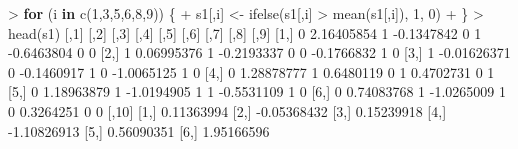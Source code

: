 \documentclass[
]{article}
\newenvironment{Shaded}{\begin{snugshade}}{\end{snugshade}}
\newcommand{\ControlFlowTok}[1]{\textcolor[rgb]{0.13,0.29,0.53}{\textbf{#1}}}
\newcommand{\DecValTok}[1]{\textcolor[rgb]{0.00,0.00,0.81}{#1}}
\newcommand{\FloatTok}[1]{\textcolor[rgb]{0.00,0.00,0.81}{#1}}
\newcommand{\FunctionTok}[1]{\textcolor[rgb]{0.00,0.00,0.00}{#1}}
\newcommand{\NormalTok}[1]{#1}
\newcommand{\OtherTok}[1]{\textcolor[rgb]{0.56,0.35,0.01}{#1}}
\newcommand{\SpecialCharTok}[1]{\textcolor[rgb]{0.00,0.00,0.00}{#1}}
\begin{document}
\begin{Shaded}
\begin{Highlighting}[]
\SpecialCharTok{\textgreater{}} \ControlFlowTok{for}\NormalTok{ (i }\ControlFlowTok{in} \FunctionTok{c}\NormalTok{(}\DecValTok{1}\NormalTok{,}\DecValTok{3}\NormalTok{,}\DecValTok{5}\NormalTok{,}\DecValTok{6}\NormalTok{,}\DecValTok{8}\NormalTok{,}\DecValTok{9}\NormalTok{)) \{}
\SpecialCharTok{+}\NormalTok{   s1[,i] }\OtherTok{\textless{}{-}} \FunctionTok{ifelse}\NormalTok{(s1[,i] }\SpecialCharTok{\textgreater{}} \FunctionTok{mean}\NormalTok{(s1[,i]), }\DecValTok{1}\NormalTok{, }\DecValTok{0}\NormalTok{)}
\SpecialCharTok{+}\NormalTok{ \}}
\SpecialCharTok{\textgreater{}} \FunctionTok{head}\NormalTok{(s1)}
\NormalTok{     [,}\DecValTok{1}\NormalTok{]        [,}\DecValTok{2}\NormalTok{] [,}\DecValTok{3}\NormalTok{]       [,}\DecValTok{4}\NormalTok{] [,}\DecValTok{5}\NormalTok{] [,}\DecValTok{6}\NormalTok{]       [,}\DecValTok{7}\NormalTok{] [,}\DecValTok{8}\NormalTok{] [,}\DecValTok{9}\NormalTok{]}
\NormalTok{[}\DecValTok{1}\NormalTok{,]    }\DecValTok{0}  \FloatTok{2.16405854}    \DecValTok{1} \SpecialCharTok{{-}}\FloatTok{0.1347842}    \DecValTok{0}    \DecValTok{1} \SpecialCharTok{{-}}\FloatTok{0.6463804}    \DecValTok{0}    \DecValTok{0}
\NormalTok{[}\DecValTok{2}\NormalTok{,]    }\DecValTok{1}  \FloatTok{0.06995376}    \DecValTok{1} \SpecialCharTok{{-}}\FloatTok{0.2193337}    \DecValTok{0}    \DecValTok{0} \SpecialCharTok{{-}}\FloatTok{0.1766832}    \DecValTok{1}    \DecValTok{0}
\NormalTok{[}\DecValTok{3}\NormalTok{,]    }\DecValTok{1} \SpecialCharTok{{-}}\FloatTok{0.01626371}    \DecValTok{0} \SpecialCharTok{{-}}\FloatTok{0.1460917}    \DecValTok{1}    \DecValTok{0} \SpecialCharTok{{-}}\FloatTok{1.0065125}    \DecValTok{1}    \DecValTok{0}
\NormalTok{[}\DecValTok{4}\NormalTok{,]    }\DecValTok{0}  \FloatTok{1.28878777}    \DecValTok{1}  \FloatTok{0.6480119}    \DecValTok{0}    \DecValTok{1}  \FloatTok{0.4702731}    \DecValTok{0}    \DecValTok{1}
\NormalTok{[}\DecValTok{5}\NormalTok{,]    }\DecValTok{0}  \FloatTok{1.18963879}    \DecValTok{1} \SpecialCharTok{{-}}\FloatTok{1.0194905}    \DecValTok{1}    \DecValTok{1} \SpecialCharTok{{-}}\FloatTok{0.5531109}    \DecValTok{1}    \DecValTok{0}
\NormalTok{[}\DecValTok{6}\NormalTok{,]    }\DecValTok{0}  \FloatTok{0.74083768}    \DecValTok{1} \SpecialCharTok{{-}}\FloatTok{1.0265009}    \DecValTok{1}    \DecValTok{0}  \FloatTok{0.3264251}    \DecValTok{0}    \DecValTok{0}
\NormalTok{           [,}\DecValTok{10}\NormalTok{]}
\NormalTok{[}\DecValTok{1}\NormalTok{,]  }\FloatTok{0.11363994}
\NormalTok{[}\DecValTok{2}\NormalTok{,] }\SpecialCharTok{{-}}\FloatTok{0.05368432}
\NormalTok{[}\DecValTok{3}\NormalTok{,]  }\FloatTok{0.15239918}
\NormalTok{[}\DecValTok{4}\NormalTok{,] }\SpecialCharTok{{-}}\FloatTok{1.10826913}
\NormalTok{[}\DecValTok{5}\NormalTok{,]  }\FloatTok{0.56090351}
\NormalTok{[}\DecValTok{6}\NormalTok{,]  }\FloatTok{1.95166596}
\end{Highlighting}
\end{Shaded}
\end{document}
